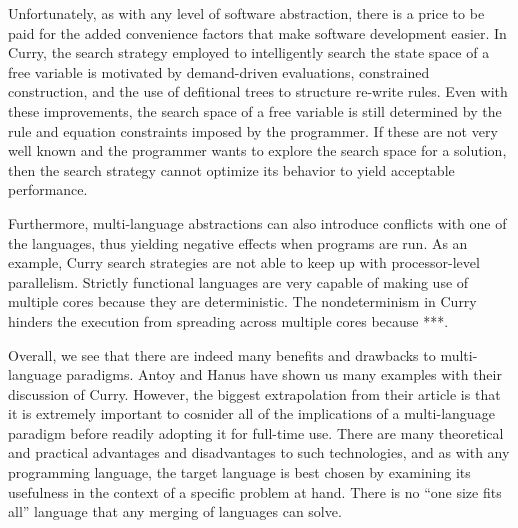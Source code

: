 \documentclass[12pt,letterpaper]{article}
\begin{document}
Unfortunately, as with any level of software abstraction, there is a price to be paid for the added 
convenience factors that make software development easier. In Curry, the search strategy employed 
to intelligently search the state space of a free variable is motivated by demand-driven evaluations, 
constrained construction, and the use of defitional trees to structure re-write rules. Even with
these improvements, the search space of a free variable is still determined by the rule and equation
constraints imposed by the programmer. If these are not very well known and the programmer wants to 
explore the search space for a solution, then the search strategy cannot optimize its behavior to yield
acceptable performance. 

Furthermore, multi-language abstractions can also introduce conflicts with one of the languages, thus
yielding negative effects when programs are run. As an example, Curry search strategies are not able to 
keep up with processor-level parallelism. Strictly functional languages are very capable of making use
of multiple cores because they are deterministic. The nondeterminism in Curry hinders the execution 
from spreading across multiple cores because ***.

Overall, we see that there are indeed many benefits and drawbacks to multi-language paradigms. Antoy and 
Hanus have shown us many examples with their discussion of Curry. However, the biggest extrapolation 
from their article is that it is extremely important to cosnider all of the implications of a 
multi-language paradigm before readily adopting it for full-time use. There are many theoretical and 
practical advantages and disadvantages to such technologies, and as with any programming language, 
the target language is best chosen by examining its usefulness in the context of a specific problem at 
hand. There is no ``one size fits all'' language that any merging of languages can solve.




\end{document}
